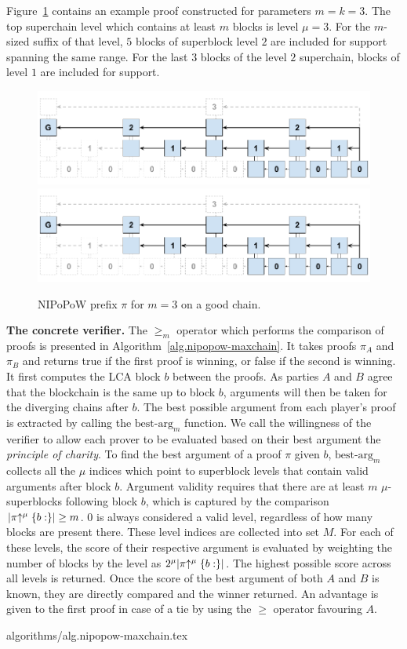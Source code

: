 Figure~\ref{fig.nipopow} contains an example proof constructed for parameters
$m = k = 3$. The top superchain level which contains at least $m$ blocks is
level $\mu = 3$. For the $m$-sized suffix of that level, $5$ blocks of
superblock level $2$ are included for support spanning the same range. For the
last $3$ blocks of the level $2$ superchain, blocks of level $1$ are included
for support.

\begin{figure}[h]
    \caption{
    NIPoPoW prefix $\pi$ for $m = 3$ on a good chain.
    }
    \centering
    \iftwocolumn
        \includegraphics[width=\columnwidth,keepaspectratio]{figures/non-interactive-popow.png}
    \else
        \includegraphics[width=0.7\columnwidth,keepaspectratio]{figures/non-interactive-popow.png}
    \fi
    \label{fig.nipopow}
\end{figure}

\noindent
\textbf{The concrete verifier.}
The $\geq_m$ operator which performs the comparison of proofs is presented in
Algorithm~\ref{alg.nipopow-maxchain}. It takes proofs $\pi_A$ and $\pi_B$ and
returns true if the first proof is winning, or false if the second is winning.
It first computes the LCA block $b$ between the proofs. As parties $A$ and $B$
agree that the blockchain is the same up to block $b$, arguments will then be
taken for the diverging chains after $b$. The best possible argument from each
player's proof is extracted by calling the $\text{best-arg}_m$ function. We call
the willingness of the verifier to allow each prover to be evaluated based on
their best argument the \textit{principle of charity}. To find the best argument
of a proof $\pi$ given $b$, $\text{best-arg}_m$ collects all the $\mu$ indices
which point to superblock levels that contain valid arguments after block $b$.
Argument validity requires that there are at least $m$ $\mu$-superblocks
following block $b$, which is captured by the comparison
$|\pi\negthickspace\uparrow^\mu\{b:\}| \geq m$. $0$ is always considered a valid level,
regardless of how many blocks are present there. These level indices are
collected into set $M$. For each of these levels, the score of their respective
argument is evaluated by weighting the number of blocks by the level as
$2^\mu|\pi\negthickspace\uparrow^\mu\{b:\}|$. The highest possible score across all levels is
returned. Once the score of the best argument of both $A$ and $B$ is known, they
are directly compared and the winner returned.  An advantage is given to the
first proof in case of a tie by using the $\geq$ operator favouring $A$.

{algorithms/alg.nipopow-maxchain.tex}
